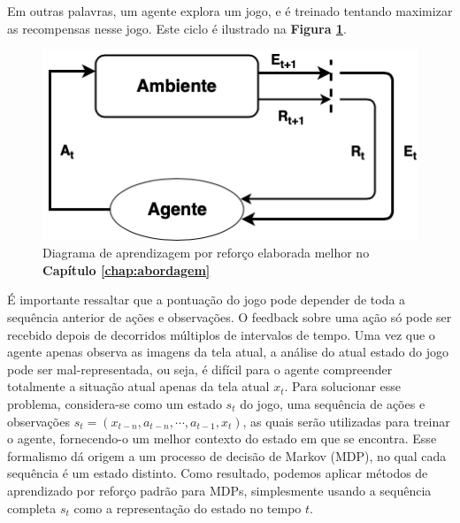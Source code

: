 Em outras palavras, um agente explora um jogo, e é treinado tentando maximizar as recompensas nesse jogo. Este ciclo é ilustrado na \textbf{Figura \ref{rl-diagram-2}}.

\begin{figure}[h]
  \centering
  \includegraphics[width=.6 \textwidth]{conteudo/imgs/rl-diagram.png}
  \caption[Diagrama de aprendizagem por reforço]{Diagrama de aprendizagem por reforço elaborada melhor no \textbf{Capítulo \ref{chap:abordagem}}
  }
  \label{rl-diagram-2}
\end{figure}




É importante ressaltar que a pontuação do jogo pode depender de toda a sequência anterior de ações e observações. O feedback sobre uma ação só pode ser recebido depois de decorridos múltiplos de intervalos de tempo. Uma vez que o agente apenas observa as imagens da tela atual, a análise do atual estado do jogo pode ser mal-representada, ou seja, é difícil para o agente compreender totalmente a situação atual apenas da tela atual $x_t$. 
Para solucionar esse problema, considera-se como um estado $s_t$ do jogo, uma sequência de ações e observações $s_t = (x_{t-n},a_{t-n},\cdots,a_{t-1},x_t)$, as quais serão utilizadas para treinar o agente, fornecendo-o um melhor contexto do estado em que se encontra. Esse formalismo dá origem a um processo de decisão de Markov (MDP), no qual cada sequência é um estado distinto. Como resultado, podemos aplicar métodos de aprendizado por reforço padrão para MDPs, simplesmente usando a sequência completa $s_t$ como a representação do estado no tempo $t$.

